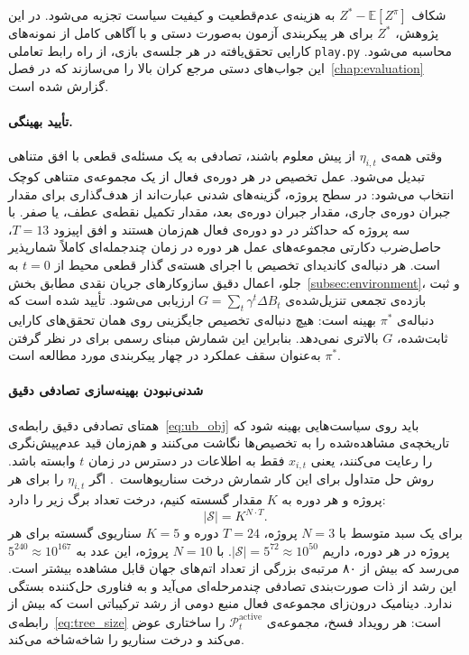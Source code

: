 شکاف $Z^* - \mathbb{E}[Z^\pi]$ به هزینه‌ی عدم‌قطعیت و کیفیت سیاست
تجزیه می‌شود. در این پژوهش، $Z^*$ برای هر پیکربندی آزمون به‌صورت دستی
و با آگاهی کامل از نمونه‌های کارایی تحقق‌یافته در هر جلسه‌ی بازی،
از راه رابط تعاملی \texttt{play.py} محاسبه می‌شود. این جواب‌های
دستی مرجع کران بالا را می‌سازند که در فصل~\ref{chap:evaluation}
گزارش شده است.

\paragraph{تأیید بهینگی.}
وقتی همه‌ی $\eta_{i,t}$ از پیش معلوم باشند،  تصادفی به یک
مسئله‌ی قطعی با افق متناهی تبدیل می‌شود. عمل تخصیص در هر دوره‌ی فعال
از یک مجموعه‌ی متناهی کوچک انتخاب می‌شود: در سطح پروژه، گزینه‌های
شدنی عبارت‌اند از هدف‌گذاری برای مقدار جبران دوره‌ی جاری، مقدار جبران
دوره‌ی بعد، مقدار تکمیل نقطه‌ی عطف، یا صفر. با سه پروژه که حداکثر در
دو دوره‌ی فعال هم‌زمان هستند و افق اپیزود $T = 13$، حاصل‌ضرب دکارتی
مجموعه‌های عمل هر دوره در زمان چندجمله‌ای کاملاً شمارپذیر است. هر
دنباله‌ی کاندیدای تخصیص با اجرای هسته‌ی گذار قطعی محیط از $t = 0$ به
جلو، اعمال دقیق سازوکارهای جریان نقدی  مطابق
بخش~\ref{subsec:environment}، و ثبت بازده‌ی تجمعی تنزیل‌شده‌ی
$G = \sum_{t} \gamma^t \Delta B_t$ ارزیابی می‌شود. تأیید شده است که
دنباله‌ی $\pi^*$ بهینه است: هیچ دنباله‌ی تخصیص جایگزینی روی همان
تحقق‌های کارایی ثابت‌شده، $G$ بالاتری نمی‌دهد. بنابراین این شمارش
مبنای رسمی برای در نظر گرفتن $\pi^*$ به‌عنوان سقف عملکرد در چهار
پیکربندی مورد مطالعه است.

\paragraph{شدنی‌نبودن بهینه‌سازی تصادفی دقیق}
\label{subsubsec:intractability}

همتای تصادفی دقیق رابطه‌ی~\eqref{eq:ub_obj} باید روی سیاست‌هایی بهینه
شود که تاریخچه‌ی مشاهده‌شده را به تخصیص‌ها نگاشت می‌کنند و هم‌زمان
قید عدم‌پیش‌نگری را رعایت می‌کنند، یعنی $x_{i,t}$ فقط به اطلاعات در
دسترس در زمان $t$ وابسته باشد. روش حل متداول برای این کار شمارش درخت
سناریوهاست~\citep{Birge2011}. اگر $\eta_{i,t}$ را برای هر پروژه و هر
دوره به $K$ مقدار گسسته کنیم، درخت تعداد برگ زیر را دارد:
\begin{equation}
  |\mathcal{S}| = K^{N \cdot T}.
  \label{eq:tree_size}
\end{equation}
برای یک سبد متوسط با $N = 3$ پروژه، $T = 24$ دوره و $K = 5$ سناریوی
گسسته برای هر پروژه در هر دوره، داریم
$|\mathcal{S}| = 5^{72} \approx 10^{50}$. با $N = 10$ پروژه، این عدد
به $5^{240} \approx 10^{167}$ می‌رسد که بیش از ۸۰ مرتبه‌ی بزرگی از
تعداد اتم‌های جهان قابل مشاهده بیشتر است. این رشد از ذات صورت‌بندی
تصادفی چندمرحله‌ای می‌آید و به فناوری حل‌کننده بستگی ندارد. دینامیک
درون‌زای مجموعه‌ی فعال منبع دومی از رشد ترکیباتی است که بیش از
رابطه‌ی~\eqref{eq:tree_size} است: هر رویداد فسخ، مجموعه‌ی
$\mathcal{P}_t^{\mathrm{active}}$ را ساختاری عوض می‌کند و درخت
سناریو را شاخه‌شاخه می‌کند.

